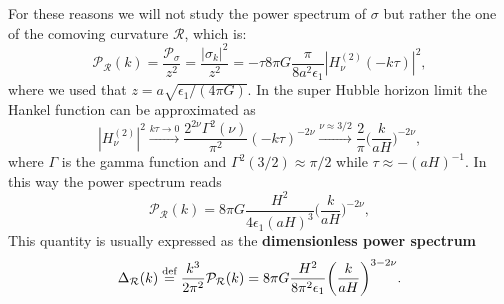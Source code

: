 For these reasons we will not study the power spectrum of $\sigma$ but rather the one of the comoving curvature $\mathcal{R}$, which is:
$$\mathcal{P_R}(k)=\frac{\mathcal{P}_\sigma}{z^2} =\frac{|\sigma_k|^2}{z^2}=-\tau8\pi G\frac{\pi}{8a^2\epsilon_1}|H_\nu^{(2)}(-k\tau)|^2,$$where we used that $z=a\sqrt{\epsilon_1/(4\pi G)}$. In the super Hubble horizon limit the Hankel function can be approximated as 
$$|H_\nu^{(2)}|^2\xrightarrow{k\tau\to0}\frac{2^{2\nu}\Gamma^2(\nu)}{\pi^2}(-k\tau)^{-2\nu}\xrightarrow{\nu\approx3/2}\frac{2}{\pi}\bigg(\frac{k}{aH}\bigg)^{-2\nu},$$ where $\Gamma$ is the gamma function and $\Gamma^2(3/2)\approx\pi/2$ while $\tau\approx-(aH)^{-1}$. In this way the power spectrum reads
\begin{equation}
    \mathcal{P_R}(k)=8\pi G\frac{H^2}{4\epsilon_1(aH)^3}\bigg(\frac{k}{aH}\bigg)^{-2\nu},\label{eq:Scalar_Power_spectrum}
\end{equation}
This quantity is usually expressed as the \textbf{dimensionless power spectrum}
\begin{equation}
    \Delta_\mathcal{R}(k)\stackrel{\text{def}}{=} \frac{k^3}{2\pi^2}\mathcal{P_R}(k)=8\pi G\frac{H^2}{8\pi^2\epsilon_1}\bigg(\frac{k}{aH}\bigg)^{3-2\nu}.\label{eq:Scalar_Dimensionless_Power_spectrum}
\end{equation}

